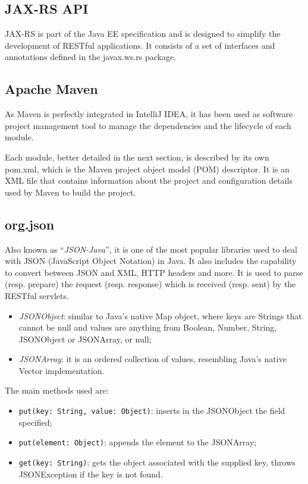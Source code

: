 \documentclass[a4paper,oneside,11pt]{book}
\newcommand{\red}[1]{\begingroup\color{punct}#1\endgroup}
\begin{document}
    \subsection{JAX-RS API}
    JAX-RS is part of the Java EE specification and is designed to simplify the development of RESTful applications. It consists of a set of interfaces and annotations defined in the javax.ws.rs package.
    
    \subsection{Apache Maven}
    As Maven is perfectly integrated in IntelliJ IDEA, it has been used as software project management tool to manage the dependencies and the lifecycle of each module. \par
    Each module, better detailed in the next section, is described by its own pom.xml, which is the Maven project object model (POM) descriptor. It is an XML file that contains information about the project and configuration details used by Maven to build the project.
    \subsection{org.json}
    Also known as “\textit{JSON-Java}”, it is one of the most popular libraries used to deal with JSON (JavaScript Object Notation) in Java. It also includes the capability to convert between JSON and XML, HTTP headers and more. It is used to parse (resp. prepare) the request (resp. response) which is received (resp. sent) by the RESTful servlets.
    \begin{itemize}
        \item \textit{JSONObject}: similar to Java’s native Map object, where keys are Strings that cannot be null and values are anything from Boolean, Number, String, JSONObject or JSONArray, or null;
        \item \textit{JSONArray}: it is an ordered collection of values, resembling Java’s native Vector implementation.
    \end{itemize}
    The main methods used are:
    \begin{itemize}
        \item \texttt{put(key: \red{String}, value: \red{Object})}: inserts in the JSONObject the field specified;
        \item \texttt{put(element: \red{Object})}: appends the element to the JSONArray;
        \item \texttt{get(key: \red{String})}: gets the object associated with the supplied key, throws JSONException if the key is not found.
    \end{itemize}
\end{document}
